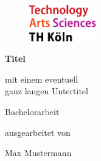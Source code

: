 \begin{titlepage}

\begin{center}

\begin{figure}[!ht]
		\includegraphics[width=0.26\textwidth]{images/THlogoheader.pdf}
\end{figure}

\vspace{0.8cm}

\begin{rmfamily}
\begin{huge}
\textbf{Titel}\\	
\end{huge}
\vspace{0.5cm}
\begin{LARGE}
mit einem eventuell\\ganz langen Untertitel\\
\end{LARGE}
\end{rmfamily}

\vspace{1.6cm}



\begin{LARGE}
\begin{scshape}
Bachelorarbeit\\[0.8em]
\end{scshape}
\end{LARGE}

\begin{large}
ausgearbeitet von\\ 
\vspace{0.2cm}
\begin{LARGE}
Max Mustermann\\
\end{LARGE}
\end{large}


\end{center}
\end{titlepage}

